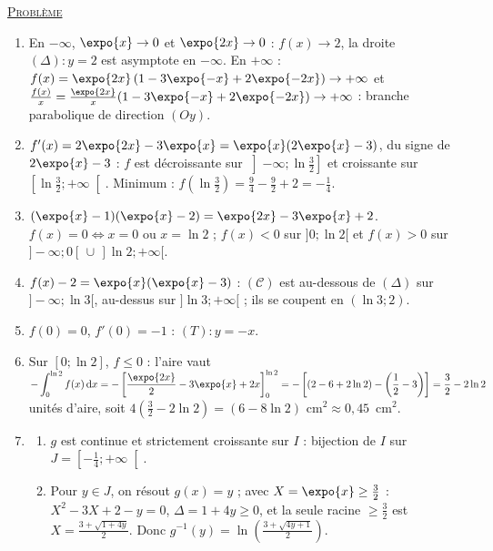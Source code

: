 \begin{corrige}
\noindent \underline{\textsc{Probl\`eme}}
\begin{enumerate}
\item En $-\infty$, $\expo{x} \to 0$ et $\expo{2x} \to 0$ : $f(x) \to 2$, la droite $(\Delta) : y = 2$ est asymptote en $-\infty$.
      En $+\infty$ : $f(x) = \expo{2x}\left(1 - 3\expo{-x} + 2\expo{-2x}\right) \to +\infty$ et $\frac{f(x)}{x} = \frac{\expo{2x}}{x}(1 - 3\expo{-x} + 2\expo{-2x}) \to +\infty$ :
      branche parabolique de direction $(Oy)$.
\item $f'(x) = 2\expo{2x} - 3\expo{x} = \expo{x}(2\expo{x} - 3)$, du signe de $2\expo{x} - 3$ : $f$ est d\'ecroissante sur
      $\left]-\infty ; \ln\frac{3}{2}\right]$ et croissante sur $\left[\ln\frac{3}{2} ; +\infty\right[$. Minimum :
      $f\left(\ln\frac{3}{2}\right) = \frac{9}{4} - \frac{9}{2} + 2 = -\frac{1}{4}$.
\item $(\expo{x} - 1)(\expo{x} - 2) = \expo{2x} - 3\expo{x} + 2$. $f(x) = 0 \iff x = 0$ ou $x = \ln 2$ ;
      $f(x) < 0$ sur $]0 ; \ln 2[$ et $f(x) > 0$ sur $]-\infty ; 0[ \,\cup\, ]\ln 2 ; +\infty[$.
\item $f(x) - 2 = \expo{x}(\expo{x} - 3)$ : $(\mathscr{C})$ est au-dessous de $(\Delta)$ sur $]-\infty ; \ln 3[$, au-dessus sur
      $]\ln 3 ; +\infty[$ ; ils se coupent en $(\ln 3 ; 2)$.
\item $f(0) = 0$, $f'(0) = -1$ : $(T) : y = -x$.
\item Sur $[0 ; \ln 2]$, $f \leq 0$ : l'aire vaut
      $-\displaystyle\int_0^{\ln 2} f(x)\,\mathrm{d}x = -\left[\frac{\expo{2x}}{2} - 3\expo{x} + 2x\right]_0^{\ln 2}
      = -\left[(2 - 6 + 2\ln 2) - \left(\frac{1}{2} - 3\right)\right] = \frac{3}{2} - 2\ln 2$ unit\'es d'aire,
      soit $4\left(\frac{3}{2} - 2\ln 2\right) = \boxed{(6 - 8\ln 2) \text{ cm}^2} \approx 0{,}45$~cm$^2$.
\item \begin{enumerate}
      \item $g$ est continue et strictement croissante sur $I$ : bijection de $I$ sur $J = \left[-\frac{1}{4} ; +\infty\right[$.
      \item Pour $y \in J$, on r\'esout $g(x) = y$ ; avec $X = \expo{x} \geq \frac{3}{2}$ : $X^2 - 3X + 2 - y = 0$,
            $\Delta = 1 + 4y \geq 0$, et la seule racine $\geq \frac{3}{2}$ est $X = \frac{3 + \sqrt{1 + 4y}}{2}$.
            Donc $\boxed{g^{-1}(y) = \ln\left(\frac{3 + \sqrt{4y + 1}}{2}\right)}$.
      \end{enumerate}
\end{enumerate}
\end{corrige}
